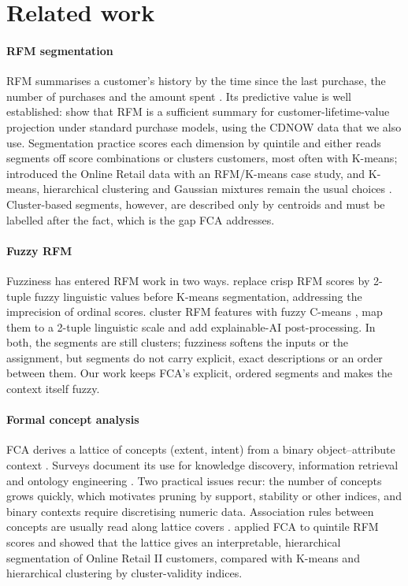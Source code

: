 \section{Related work}\label{sec:related}

\paragraph{RFM segmentation} RFM summarises a customer's history by the time since the last purchase, the number of purchases and the amount spent \citep{hughes1994}. Its predictive value is well established: \citet{fader2005} show that RFM is a sufficient summary for customer-lifetime-value projection under standard purchase models, using the CDNOW data that we also use. Segmentation practice scores each dimension by quintile and either reads segments off score combinations or clusters customers, most often with K-means; \citet{chen2012} introduced the Online Retail data with an RFM/K-means case study, and K-means, hierarchical clustering and Gaussian mixtures remain the usual choices \citep{wedel2000}. Cluster-based segments, however, are described only by centroids and must be labelled after the fact, which is the gap FCA addresses.

\paragraph{Fuzzy RFM} Fuzziness has entered RFM work in two ways. \citet{carrasco2019} replace crisp RFM scores by 2-tuple fuzzy linguistic values before K-means segmentation, addressing the imprecision of ordinal scores. \citet{marindiaz2025} cluster RFM features with fuzzy C-means \citep{bezdek1981}, map them to a 2-tuple linguistic scale and add explainable-AI post-processing. In both, the segments are still clusters; fuzziness softens the inputs or the assignment, but segments do not carry explicit, exact descriptions or an order between them. Our work keeps FCA's explicit, ordered segments and makes the context itself fuzzy.

\paragraph{Formal concept analysis} FCA derives a lattice of concepts (extent, intent) from a binary object--attribute context \citep{ganter1999}. Surveys document its use for knowledge discovery, information retrieval and ontology engineering \citep{poelmans2013app,poelmans2013mod,singh2016}. Two practical issues recur: the number of concepts grows quickly, which motivates pruning by support, stability \citep{kuznetsov2007} or other indices, and binary contexts require discretising numeric data. Association rules between concepts are usually read along lattice covers \citep{luxenburger1991}. \citet{rungruang2024} applied FCA to quintile RFM scores and showed that the lattice gives an interpretable, hierarchical segmentation of Online Retail II customers, compared with K-means and hierarchical clustering by cluster-validity indices.

